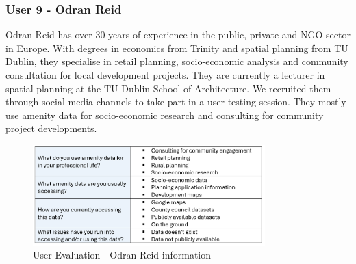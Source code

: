 \newpage{}

\subsubsection{User 9 - Odran Reid}
Odran Reid has over 30 years of experience in the public,
private and NGO sector in Europe. With degrees in economics from Trinity and
spatial planning from TU Dublin, they specialise in retail planning,
socio-economic analysis and community consultation for local development
projects. They are currently a lecturer in spatial planning at the TU Dublin
School of Architecture. We recruited them through social media channels to take
part in a user testing session. They mostly use amenity data for socio-economic
research and consulting for community project developments.

\begin{figure}[h!]
    \centering
    \includegraphics[width=0.8\textwidth]{images/odran-amenity-info.png}
    \caption{User Evaluation - Odran Reid information}
\end{figure}

